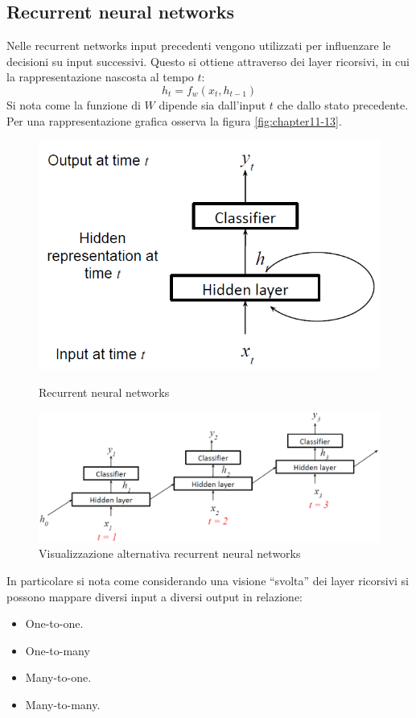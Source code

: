 	\subsection{Recurrent neural networks}
	Nelle recurrent networks input precedenti vengono utilizzati per influenzare le decisioni su input successivi.
	Questo si ottiene attraverso dei layer ricorsivi, in cui la rappresentazione nascosta al tempo $t$:
	$$h_t = f_w(x_t, h_{t-1})$$
	Si nota come la funzione di $W$ dipende sia dall'input $t$ che dallo stato precedente. 
	Per una rappresentazione grafica osserva la figura \ref{fig:chapter11-13}.
	
	\begin{figure}
		\centering
		\begin{minipage}{.5\textwidth}
			\centering
			\includegraphics[width=0.8\linewidth]{imgs/chapter11/img13}
			\caption{Recurrent neural networks}
			\label{fig:chapter11-13}			
		\end{minipage}%
		\begin{minipage}{.5\textwidth}
			\centering
			\includegraphics[width=1\linewidth]{imgs/chapter11/img17}
			\caption{Visualizzazione alternativa recurrent neural networks}
			\label{fig:chapter11-17}
		\end{minipage}
	\end{figure}
	
	
	In particolare si nota come considerando una visione ``svolta'' dei layer ricorsivi si possono mappare diversi input a diversi output in relazione:
	\begin{multicols}{2}
		\begin{itemize}
			\item One-to-one.
			\item One-to-many
			\item Many-to-one.
			\item Many-to-many.
		\end{itemize}
	\end{multicols}
	
